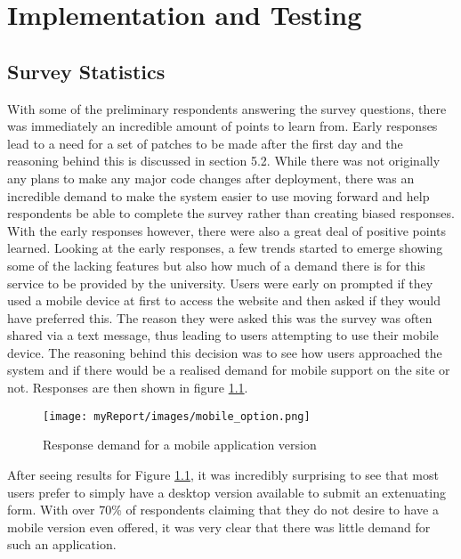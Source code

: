\chapter{Implementation and Testing}

\section{Survey Statistics}

With some of the preliminary respondents answering the survey questions, there was immediately an incredible amount of points to learn from. Early responses lead to a need for a set of patches to be made after the first day and the reasoning behind this is discussed in section 5.2. While there was not originally any plans to make any major code changes after deployment, there was an incredible demand to make the system easier to use moving forward and help respondents be able to complete the survey rather than creating biased responses.
\newline
\newline
With the early responses however, there were also a great deal of positive points learned. Looking at the early responses, a few trends started to emerge showing some of the lacking features but also how much of a demand there is for this service to be provided by the university. Users were early on prompted if they used a mobile device at first to access the website and then asked if they would have preferred this. The reason they were asked this was the survey was often shared via a text message, thus leading to users attempting to use their mobile device. The reasoning behind this decision was to see how users approached the system and if there would be a realised demand for mobile support on the site or not. Responses are then shown in figure \ref{fig:mobile_support}.

\pagebreak
\begin{figure}[ht]
\centering
\texttt{[image: myReport/images/mobile\_option.png]}
\caption{Response demand for a mobile application version}
\label{fig:mobile_support}
\end{figure}

After seeing results for Figure \ref{fig:mobile_support}, it was incredibly surprising to see that most users prefer to simply have a desktop version available to submit an extenuating form. With over 70\% of respondents claiming that they do not desire to have a mobile version even offered, it was very clear that there was little demand for such an application.

